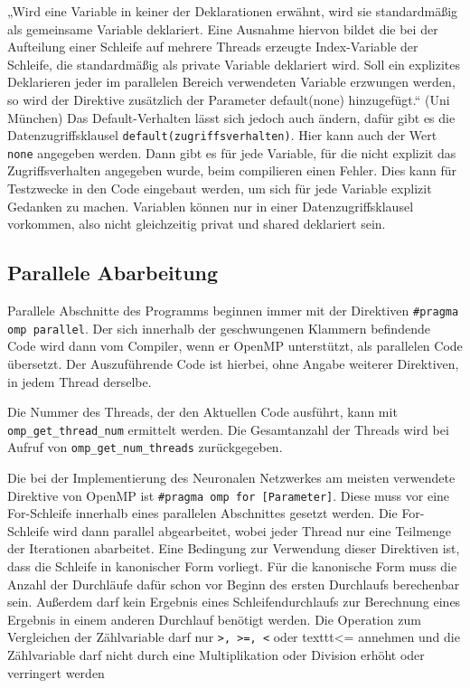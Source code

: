 \documentclass[../main.tex]{subfiles}
\begin{document}
„Wird eine Variable in keiner der Deklarationen erwähnt, wird sie standardmäßig als gemeinsame Variable deklariert. Eine Ausnahme hiervon bildet die bei der Aufteilung einer Schleife auf mehrere Threads erzeugte Index-Variable der Schleife, die standardmäßig als private Variable deklariert wird. Soll ein explizites Deklarieren jeder im parallelen Bereich verwendeten Variable erzwungen werden, so wird der Direktive zusätzlich der Parameter default(none) hinzugefügt.“ (Uni München)
Das Default-Verhalten lässt sich jedoch auch ändern, dafür gibt es die Datenzugriffsklausel \texttt{default(zugriffsverhalten)}. Hier kann auch der Wert \texttt{none} angegeben werden. Dann gibt es für jede Variable, für die nicht explizit das Zugriffsverhalten angegeben wurde, beim compilieren einen Fehler. Dies kann für Testzwecke in den Code eingebaut werden, um sich für jede Variable explizit Gedanken zu machen.
Variablen können nur in einer Datenzugriffsklausel vorkommen, also nicht gleichzeitig privat und shared deklariert sein.

\subsection{Parallele Abarbeitung}

Parallele Abschnitte des Programms beginnen immer mit der Direktiven \texttt{\#pragma omp parallel}. Der sich innerhalb der geschwungenen Klammern befindende Code wird dann vom Compiler, wenn er OpenMP unterstützt, als parallelen Code übersetzt. Der Auszuführende Code ist hierbei, ohne Angabe weiterer Direktiven, in jedem Thread derselbe. 

Die Nummer des Threads, der den Aktuellen Code ausführt, kann mit \linebreak \texttt{omp\_get\_thread\_num} ermittelt werden. Die Gesamtanzahl der Threads wird bei Aufruf von \texttt{omp\_get\_num\_threads} zurückgegeben.

Die bei der Implementierung des Neuronalen Netzwerkes am meisten verwendete Direktive von OpenMP ist \texttt{\#pragma omp for [Parameter]}. Diese muss vor eine For-Schleife innerhalb eines parallelen Abschnittes gesetzt werden. Die For-Schleife wird dann parallel abgearbeitet, wobei jeder Thread nur eine Teilmenge der Iterationen abarbeitet. Eine Bedingung zur Verwendung dieser Direktiven ist, dass die Schleife in kanonischer Form vorliegt. Für die kanonische Form muss die Anzahl der Durchläufe dafür schon vor Beginn des ersten Durchlaufs berechenbar sein. Außerdem darf kein Ergebnis eines Schleifendurchlaufs zur Berechnung eines Ergebnis in einem anderen Durchlauf benötigt werden. Die Operation zum Vergleichen der Zählvariable darf nur \texttt{>, >=, <} oder texttt{<=} annehmen und die Zählvariable darf nicht durch eine Multiplikation oder Division erhöht oder verringert werden
\end{document}
